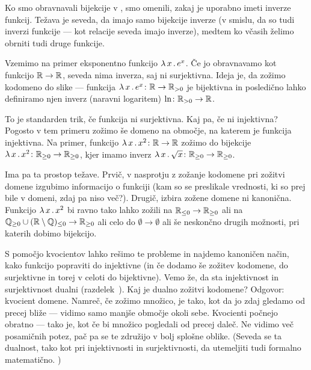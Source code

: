 		
		Ko smo obravnavali bijekcije v , smo omenili, zakaj je uporabno imeti inverze funkcij. Težava je seveda, da imajo samo bijekcije inverze (v smislu, da so tudi inverzi funkcije --- kot relacije seveda imajo inverze), medtem ko včasih želimo obrniti tudi druge funkcije.
		
		Vzemimo na primer eksponentno funkcijo $\xlam{x}{e^x}$. Če jo obravnavamo kot funkcijo $\mathbb{R} \to \mathbb{R}$, seveda nima inverza, saj ni surjektivna. Ideja je, da zožimo kodomeno do slike --- funkcija $\xlam{x}{e^x}\colon \RR \to \RR_{> 0}$ je bijektivna in posledično lahko definiramo njen inverz (naravni logaritem) $\ln\colon \mathbb{R}_{> 0} \to \mathbb{R}$.
		
		To je standarden trik, če funkcija ni surjektivna. Kaj pa, če ni injektivna? Pogosto v tem primeru zožimo še domeno na območje, na katerem je funkcija injektivna. Na primer, funkcijo $\xlam{x}{x^2}\colon \RR \to \RR$ zožimo do bijekcije $\xlam{x}{x^2}\colon \RR_{\geq 0} \to \RR_{\geq 0}$, kjer imamo inverz $\xlam{x}{\sqrt{x}}\colon \RR_{\geq 0} \to \RR_{\geq 0}$.
		
		Ima pa ta prostop težave. Prvič, v nasprotju z zožanje kodomene pri zožitvi domene izgubimo informacijo o funkciji (kam so se preslikale vrednosti, ki so prej bile v domeni, zdaj pa niso več?). Drugič, izbira zožene domene ni kanonična. Funkcijo $\xlam{x}{x^2}$ bi ravno tako lahko zožili na $\mathbb{R}_{\leq 0} \to \mathbb{R}_{\geq 0}$ ali na $\mathbb{Q}_{\geq 0} \cup (\mathbb{R} \setminus \mathbb{Q})_{\leq 0} \to \mathbb{R}_{\geq 0}$ ali celo do $\emptyset \to \emptyset$ ali še neskončno drugih možnosti, pri katerih dobimo bijekcijo.
		
		S pomočjo kvocientov lahko rešimo te probleme in najdemo kanoničen način, kako funkcijo popraviti do injektivne (in če dodamo še zožitev kodomene, do surjektivne in torej v celoti do bijektivne). Vemo že, da sta injektivnost in surjektivnost dualni (razdelek~). Kaj je dualno zožitvi kodomene? Odgovor: kvocient domene. Namreč, če zožimo množico, je tako, kot da jo zdaj gledamo od precej bliže --- vidimo samo manjše območje okoli sebe. Kvocienti počnejo obratno --- tako je, kot če bi množico pogledali od precej daleč. Ne vidimo več posamičnih potez, pač pa se te združijo v bolj splošne oblike. (Seveda se ta dualnost, tako kot pri injektivnosti in surjektivnosti, da utemeljiti tudi formalno matematično. )
		
